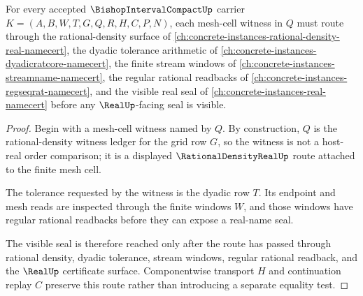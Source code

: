 \begin{theorem}
\label{thm:bishop-interval-compact-rational-density-routing}
For every accepted $\BishopIntervalCompactUp$ carrier $K=(A,B,W,T,G,Q,R,H,C,P,N)$, each mesh-cell witness in $Q$ must route through the rational-density surface of \autoref{ch:concrete-instances-rational-density-real-namecert}, the dyadic tolerance arithmetic of \autoref{ch:concrete-instances-dyadicratcore-namecert}, the finite stream windows of \autoref{ch:concrete-instances-streamname-namecert}, the regular rational readbacks of \autoref{ch:concrete-instances-regseqrat-namecert}, and the visible real seal of \autoref{ch:concrete-instances-real-namecert} before any $\RealUp$-facing seal is visible.
\end{theorem}
\begin{proof}
Begin with a mesh-cell witness named by $Q$. By construction, $Q$ is the rational-density witness ledger for the grid row $G$, so the witness is not a host-real order comparison; it is a displayed $\RationalDensityRealUp$ route attached to the finite mesh cell.

The tolerance requested by the witness is the dyadic row $T$. Its endpoint and mesh reads are inspected through the finite windows $W$, and those windows have regular rational readbacks before they can expose a real-name seal.

The visible seal is therefore reached only after the route has passed through rational density, dyadic tolerance, stream windows, regular rational readback, and the $\RealUp$ certificate surface. Componentwise transport $H$ and continuation replay $C$ preserve this route rather than introducing a separate equality test.
\end{proof}

